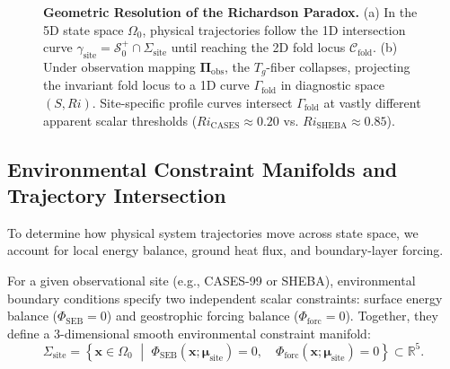 \begin{figure}[t]
\caption{\textbf{Geometric Resolution of the Richardson Paradox.} (a) In the 5D state space $\Omega_0$, physical trajectories follow the 1D intersection curve $\gamma_{\mathrm{site}} = \mathcal{S}_0^+ \cap \Sigma_{\mathrm{site}}$ until reaching the 2D fold locus $\mathcal{C}_{\mathrm{fold}}$. (b) Under observation mapping $\boldsymbol{\Pi}_{\mathrm{obs}}$, the $T_g$-fiber collapses, projecting the invariant fold locus to a 1D curve $\Gamma_{\mathrm{fold}}$ in diagnostic space $(S, Ri)$. Site-specific profile curves intersect $\Gamma_{\mathrm{fold}}$ at vastly different apparent scalar thresholds ($Ri_{\mathrm{CASES}} \approx 0.20$ vs. $Ri_{\mathrm{SHEBA}} \approx 0.85$).}
\label{fig:projection_paradox}
\end{figure}

\subsection{Environmental Constraint Manifolds and Trajectory Intersection}

To determine how physical system trajectories move across state space, we account for local energy balance, ground heat flux, and boundary-layer forcing.

\begin{definition}
For a given observational site (e.g., CASES-99 or SHEBA), environmental boundary conditions specify two independent scalar constraints: surface energy balance ($\Phi_{\mathrm{SEB}} = 0$) and geostrophic forcing balance ($\Phi_{\mathrm{forc}} = 0$). Together, they define a 3-dimensional smooth environmental constraint manifold:
\begin{equation}
\Sigma_{\mathrm{site}} = \left\{ \mathbf{x} \in \Omega_0 \,\,\middle\vert\,\, \Phi_{\mathrm{SEB}}(\mathbf{x}; \boldsymbol{\mu}_{\mathrm{site}}) = 0, \quad \Phi_{\mathrm{forc}}(\mathbf{x}; \boldsymbol{\mu}_{\mathrm{site}}) = 0 \right\} \subset \mathbb{R}^5.
\end{equation}
\end{definition}

